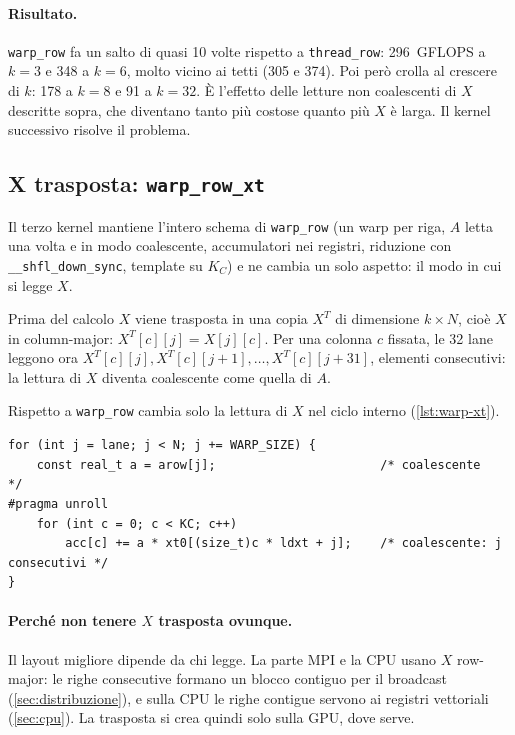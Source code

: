 \documentclass[11pt,a4paper]{article}
\begin{document}
\paragraph{Risultato.} \texttt{warp\_row} fa un salto di quasi 10 volte
rispetto a \texttt{thread\_row}: 296~GFLOPS a $k = 3$ e 348 a $k = 6$, molto
vicino ai tetti (305 e 374). Poi però crolla al crescere di $k$: 178 a $k = 8$
e 91 a $k = 32$. È l'effetto delle letture non coalescenti di $X$ descritte
sopra, che diventano tanto più costose quanto più $X$ è larga. Il kernel
successivo risolve il problema.


\subsection{X trasposta: \texttt{warp\_row\_xt}}\label{sec:warp-xt}

Il terzo kernel mantiene l'intero schema di \texttt{warp\_row} (un warp per
riga, $A$ letta una volta e in modo coalescente, accumulatori nei registri,
riduzione con \texttt{\_\_shfl\_down\_sync}, template su $K_C$) e ne cambia un
solo aspetto: il modo in cui si legge $X$.

Prima del calcolo $X$ viene trasposta in una copia
$X^T$ di dimensione $k \times N$, cioè $X$ in column-major:
$X^T[c][j] = X[j][c]$. Per una colonna $c$ fissata, le 32 lane leggono ora
$X^T[c][j], X^T[c][j+1], \dots, X^T[c][j+31]$, elementi consecutivi: la
lettura di $X$ diventa coalescente come quella di $A$.

Rispetto a \texttt{warp\_row} cambia solo la lettura di $X$ nel ciclo interno
(\cref{lst:warp-xt}).

\begin{lstlisting}[caption={Ciclo principale di \texttt{warp\_row\_xt} (\texttt{kernel\_warp\_row\_xt.cu}).}, label={lst:warp-xt}]
for (int j = lane; j < N; j += WARP_SIZE) {
    const real_t a = arow[j];                       /* coalescente               */
#pragma unroll
    for (int c = 0; c < KC; c++)
        acc[c] += a * xt0[(size_t)c * ldxt + j];    /* coalescente: j consecutivi */
}
\end{lstlisting}

\paragraph{Perché non tenere $X$ trasposta ovunque.} Il layout migliore
dipende da chi legge. La parte MPI e la CPU usano $X$ row-major: le righe
consecutive formano un blocco contiguo per il broadcast (\cref{sec:distribuzione}), e
sulla CPU le righe contigue servono ai registri vettoriali (\cref{sec:cpu}).
La trasposta si crea quindi solo sulla GPU, dove serve.
\end{document}
